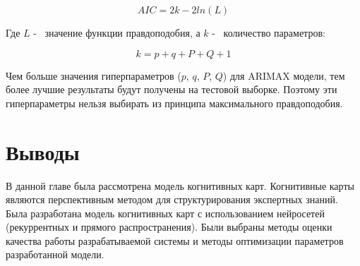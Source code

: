 \begin{equation}\label{eq:akaike}
	AIC = 2k - 2 ln(L)
\end{equation}

\noindent Где $ L $ -~ значение функции правдоподобия,
а $ k $ -~ количество параметров:

\begin{equation}\label{eq:params_amount_akaike}
	k = p + q + P + Q + 1
\end{equation}

Чем больше значения гиперпараметров ($ p $, $ q $, $ P $, $ Q $) для ARIMAX модели, тем более лучшие
результаты будут получены на тестовой выборке. Поэтому эти гиперпараметры нельзя
выбирать из принципа максимального правдоподобия.

\section{Выводы}

В данной главе была рассмотрена модель когнитивных карт.
Когнитивные карты являются перспективным методом для структурирования
экспертных знаний.
Была разработана модель когнитивных карт с использованием нейросетей (рекуррентных и прямого распространения).
Были выбраны методы оценки качества работы разрабатываемой системы
и методы оптимизации параметров разработанной модели.
